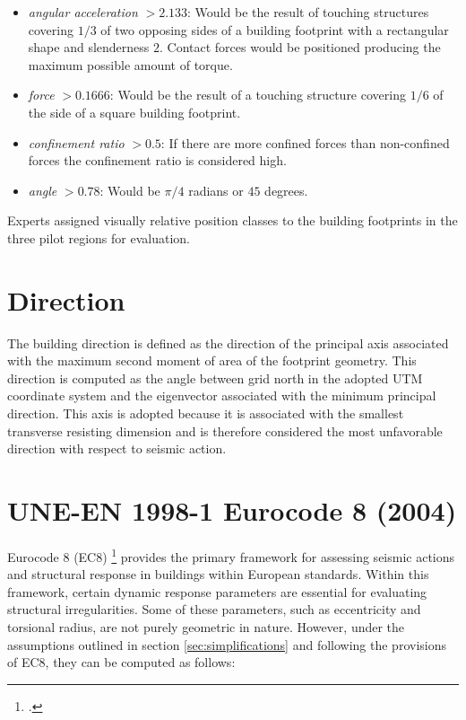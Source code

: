 \begin{refsection}
\begin{itemize}
    \item \textit{angular acceleration} $> 2.133$: Would be the result of touching structures covering $1/3$ of two opposing sides of a building footprint with a rectangular shape and slenderness $2$. Contact forces would be positioned producing the maximum possible amount of torque. 
    \item \textit{force} $> 0.1666$: Would be the result of a touching structure covering $1/6$ of the side of a square building footprint.
    \item \textit{confinement ratio} $> 0.5$: If there are more confined forces than non-confined forces the confinement ratio is considered high.
    \item \textit{angle} $> 0.78$: Would be $\pi / 4$ radians or $45$ degrees. 
\end{itemize}

Experts assigned visually relative position classes to the building footprints in the three pilot regions for evaluation.


\vspace{1em} 

\renewcommand{\sectionnametext}{Direction}
\renewcommand{\headingtextR}{\thesection. \sectionnametext}
\section{\sectionnametext}


The building direction is defined as the direction of the principal axis associated with the maximum second moment of area of the footprint geometry. This direction is computed as the angle between grid north in the adopted UTM coordinate system and the eigenvector associated with the minimum principal direction. This axis is adopted because it is associated with the smallest transverse resisting dimension and is therefore considered the most unfavorable direction with respect to seismic action.

\renewcommand{\sectionnametext}{UNE-EN 1998-1 Eurocode 8 (2004)}
\renewcommand{\headingtextR}{\thesection. \sectionnametext}
\section{\sectionnametext}
\label{sec:EC8}

Eurocode 8 (EC8) \footcite{en_1998_en1998_2011} provides the primary framework for assessing seismic actions and structural response in buildings within European standards. Within this framework, certain dynamic response parameters are essential for evaluating structural irregularities. Some of these parameters, such as eccentricity and torsional radius, are not purely geometric in nature. However, under the assumptions outlined in section \ref{sec:simplifications} and following the provisions of EC8, they can be computed as follows:



\end{refsection}
